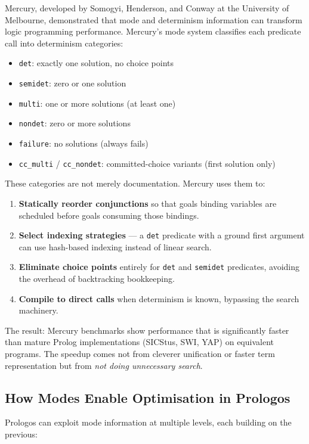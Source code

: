 \documentclass[11pt]{article}
\begin{document}
Mercury, developed by Somogyi, Henderson, and Conway at the University of
Melbourne, demonstrated that mode and determinism information can transform logic
programming performance. Mercury's mode system classifies each predicate call
into determinism categories:

\begin{itemize}
\item \texttt{det}: exactly one solution, no choice points
\item \texttt{semidet}: zero or one solution
\item \texttt{multi}: one or more solutions (at least one)
\item \texttt{nondet}: zero or more solutions
\item \texttt{failure}: no solutions (always fails)
\item \texttt{cc\_multi} / \texttt{cc\_nondet}: committed-choice variants (first solution only)
\end{itemize}

These categories are not merely documentation. Mercury uses them to:

\begin{enumerate}
\item \textbf{Statically reorder conjunctions} so that goals binding variables are
scheduled before goals consuming those bindings.
\item \textbf{Select indexing strategies} --- a \texttt{det} predicate with a ground first
argument can use hash-based indexing instead of linear search.
\item \textbf{Eliminate choice points} entirely for \texttt{det} and \texttt{semidet} predicates,
avoiding the overhead of backtracking bookkeeping.
\item \textbf{Compile to direct calls} when determinism is known, bypassing the
search machinery.
\end{enumerate}

The result: Mercury benchmarks show performance that is significantly faster than
mature Prolog implementations (SICStus, SWI, YAP) on equivalent programs. The
speedup comes not from cleverer unification or faster term representation but
from \emph{not doing unnecessary search}.
\subsection{How Modes Enable Optimisation in Prologos}
\label{sec:org7e96d47}

Prologos can exploit mode information at multiple levels, each building on the
previous:
\end{document}
